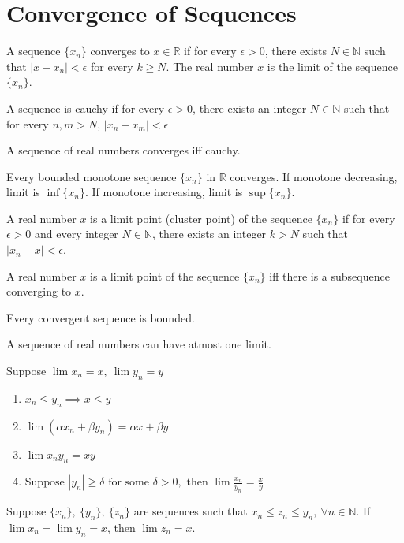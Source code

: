 \section{Convergence of Sequences}
	\begin{definition}
		A sequence $\{x_n\}$ converges to $x \in \mathbb{R}$ if for every $\epsilon > 0$, there exists $N \in \mathbb{N}$ such that $|x-x_n| < \epsilon$ for every $k \ge N$. The real number $x$ is the limit of the sequence $\{x_n\}$.
	\end{definition}
	\begin{definition}
		A sequence is cauchy if for every $\epsilon > 0$, there exists an integer $N \in \mathbb{N}$ such that for every $n,m > N$, $|x_n-x_m| < \epsilon$
	\end{definition}
	\begin{remark}
		A sequence of real numbers converges iff cauchy.
	\end{remark}
	\begin{theorem}
		Every bounded monotone sequence $\{x_n\}$ in $\mathbb{R}$ converges. If monotone decreasing, limit is $\inf \{x_n\}$. If monotone increasing, limit is $\sup \{x_n\}$.
	\end{theorem}
	\begin{definition}
		A real number $x$ is a limit point (cluster point) of the sequence $\{x_n\}$ if for every $\epsilon > 0$ and every integer $N \in \mathbb{N}$, there exists an integer $k > N$ such that $|x_n - x| < \epsilon$.
	\end{definition}
	\begin{remark}
		A real number $x$ is a limit point of the sequence $\{x_n\}$ iff there is a subsequence converging to $x$.
	\end{remark}
	\begin{remark}
		Every convergent sequence is bounded.
	\end{remark}
	\begin{remark}
		A sequence of real numbers can have atmost one limit.
	\end{remark}
	\begin{remark}
		Suppose $\lim x_n = x,\ \lim y_n = y$
		\begin{enumerate}
			\item $x_n \le y_n \implies x \le y$
			\item $\lim (\alpha x_n + \beta y_n ) = \alpha x + \beta y$
			\item $\lim x_ny_n = xy$
			\item $ \text{Suppose } |y_n| \ge \delta \text{ for some } \delta > 0, \text{ then } \lim \frac{x_n}{y_n} = \frac{x}{y}$
		\end{enumerate}
	\end{remark}
	\begin{lemma}[Sandwitch]
		Suppose $\{x_n\},\ \{y_n\},\ \{z_n\}$ are sequences such that $x_n \le z_n \le y_n,\ \forall n \in \mathbb{N}$. If $\lim x_n = \lim y_n = x$, then $\lim z_n = x$.
	\end{lemma}

